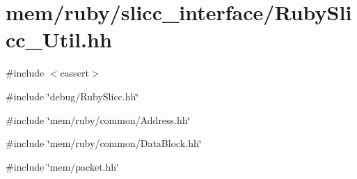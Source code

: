 \hypertarget{RubySlicc__Util_8hh}{
\section{mem/ruby/slicc\_\-interface/RubySlicc\_\-Util.hh}
\label{RubySlicc__Util_8hh}
}
{\ttfamily \#include $<$cassert$>$}\par
{\ttfamily \#include \char`\"{}debug/RubySlicc.hh\char`\"{}}\par
{\ttfamily \#include \char`\"{}mem/ruby/common/Address.hh\char`\"{}}\par
{\ttfamily \#include \char`\"{}mem/ruby/common/DataBlock.hh\char`\"{}}\par
{\ttfamily \#include \char`\"{}mem/packet.hh\char`\"{}}\par
